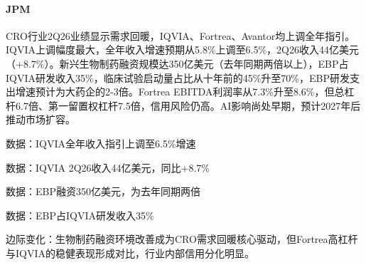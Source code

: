 \documentclass[11pt]{ctexart}
\begin{document}
\paragraph{JPM} CRO行业2Q26业绩显示需求回暖，IQVIA、Fortrea、Avantor均上调全年指引。IQVIA上调幅度最大，全年收入增速预期从5.8\%上调至6.5\%，2Q26收入44亿美元（+8.7\%）。新兴生物制药融资规模达350亿美元（去年同期两倍以上），EBP占IQVIA研发收入35\%，临床试验启动量占比从十年前的45\%升至70\%，EBP研发支出增速预计为大药企的2-3倍。Fortrea EBITDA利润率从7.3\%升至8.6\%，但总杠杆6.7倍、第一留置权杠杆7.5倍，信用风险仍高。AI影响尚处早期，预计2027年后推动市场扩容。
{\small\color{refgray}数据：IQVIA全年收入指引上调至6.5\%增速\par}
{\small\color{refgray}数据：IQVIA 2Q26收入44亿美元，同比+8.7\%\par}
{\small\color{refgray}数据：EBP融资350亿美元，为去年同期两倍\par}
{\small\color{refgray}数据：EBP占IQVIA研发收入35\%\par}
{\small\color{refgray}边际变化：生物制药融资环境改善成为CRO需求回暖核心驱动，但Fortrea高杠杆与IQVIA的稳健表现形成对比，行业内部信用分化明显。\par}
\end{document}
